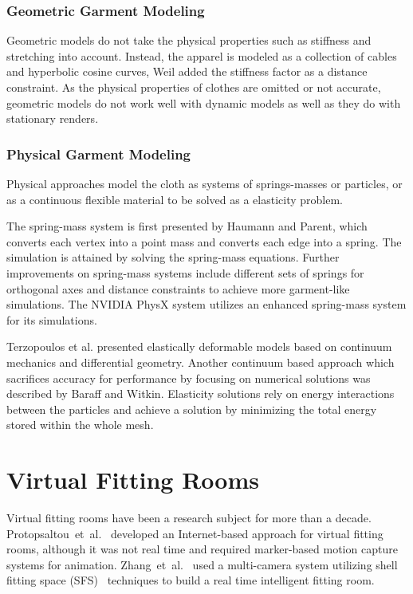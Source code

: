 \subsubsection{Geometric Garment Modeling}
Geometric models 
do not take the physical properties such as stiffness and stretching into account. Instead, the apparel is modeled as a collection of cables and hyperbolic cosine curves, Weil added the stiffness
factor as a distance constraint\cite{Weil1986}. As the physical properties of clothes are omitted or not accurate, geometric models do not work well with dynamic models as well as they do with 
stationary renders\cite{Weil1986}.

\subsubsection{Physical Garment Modeling}
Physical approaches model the cloth as systems of springs-masses or particles, or as a continuous flexible material to be solved as a elasticity problem.

The spring-mass system is first presented by Haumann and Parent\cite{Haumann1988}, which converts 
each vertex into a point mass and converts each edge into a spring. The simulation is attained by solving the spring-mass equations. Further improvements on spring-mass systems include
different sets of springs for orthogonal axes and distance constraints to achieve more garment-like simulations\cite{Provot1996}. The NVIDIA PhysX system utilizes an enhanced 
spring-mass system for its simulations\cite{Kim2011}.

Terzopoulos et al.\cite{Terzopoulos1987} presented elastically deformable models based on continuum mechanics and differential geometry. Another continuum based approach which 
sacrifices accuracy for performance by focusing on numerical solutions was described by Baraff and Witkin\cite{Baraff1998}. Elasticity solutions rely on energy interactions between 
the particles and achieve a solution by minimizing the total energy stored within the whole mesh.

\section{Virtual Fitting Rooms}
\label{section_related_virtual_fitting}

Virtual fitting rooms have been a research subject for more than a decade. Protopsaltou~et~al.~\cite{Protopsaltou2002} developed an Inter\-net-based approach 
for virtual fitting rooms, although it was not real time and required marker-based motion capture systems for animation. Zhang~et~al.~\cite{Zhang2008} used a 
multi-camera system utilizing shell fitting space (SFS)~\cite{Cheung2005} techniques to build a real time intelligent fitting room.

